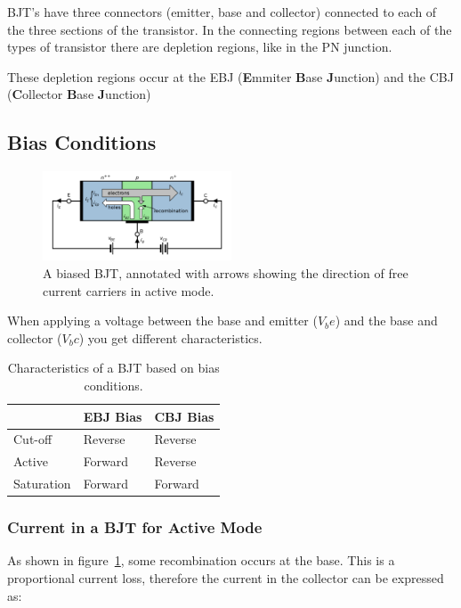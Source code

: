 BJT's have three connectors (emitter, base and collector) connected to each of the three sections of the transistor. In the connecting regions between each of the types of transistor there are depletion regions, like in the PN junction.

These depletion regions occur at the EBJ (\textbf{E}mmiter \textbf{B}ase \textbf{J}unction) and the CBJ (\textbf{C}ollector \textbf{B}ase \textbf{J}unction)

\subsection{Bias Conditions}

\begin{figure}[H]
\label{fig-active-bjt}
\centering
\includegraphics[width=0.5\textwidth]{images/npn-bias.png}
\caption{A biased BJT, annotated with arrows showing the direction of free current carriers in active mode.}
\end{figure}

When applying a voltage between the base and emitter ($V_be$) and the base and collector ($V_bc$) you get different characteristics.

\begin{table}[H]
	\centering
	\caption{Characteristics of a BJT based on bias conditions.}
    \begin{tabular}{lll}
     & EBJ Bias & CBJ Bias \\
    \hline
    Cut-off & Reverse & Reverse \\
    Active & Forward & Reverse \\
    Saturation & Forward & Forward
    \end{tabular}
\end{table}

\subsubsection{Current in a BJT for Active Mode}

As shown in figure~\ref{fig-active-bjt}, some recombination occurs at the base. This is a proportional current loss, therefore the current in the collector can be expressed as:

